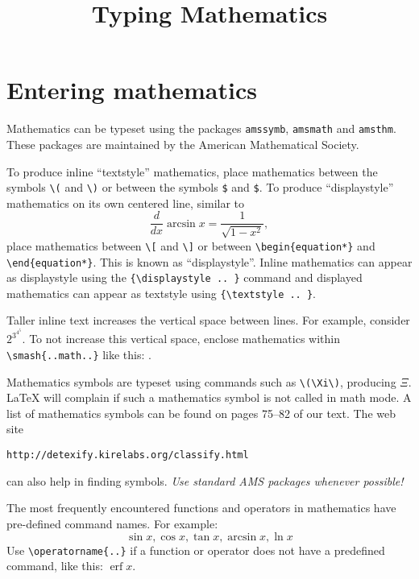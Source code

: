 \documentclass{article}
\title{Typing Mathematics}
\date{}
\begin{document}
\maketitle

\section{Entering mathematics}

Mathematics can be typeset using the packages \texttt{amssymb},
\texttt{amsmath} and \texttt{amsthm}.  These packages are maintained by the
American Mathematical Society.

To produce inline ``textstyle'' mathematics, place mathematics between the
symbols \verb`\(` and \verb`\)` or between the symbols \verb`$` and \verb`$`.
To produce ``displaystyle'' mathematics on its own centered line, similar to
\begin{equation*}
  \frac{d}{dx} \arcsin x = \frac{1}{\sqrt{1 - x^2}},
\end{equation*}
place mathematics between \verb`\[` and \verb`\]` or between
\verb`\begin{equation*}` and \verb`\end{equation*}`.  This is known as
``displaystyle''.  Inline mathematics can appear as displaystyle using the
\verb!{\displaystyle .. }! command and displayed mathematics can appear as
textstyle using \verb`{\textstyle .. }`.

Taller inline text increases the vertical space between lines.  For example,
consider \(2^{3^{4^5}}\).  To not increase this vertical space, enclose
mathematics within \verb~\smash{..math..}~ like this: .

Mathematics symbols are typeset using commands such as \verb~\(\Xi\)~,
producing \(\Xi\).  \LaTeX{} will complain if such a mathematics symbol is not
called in math mode.  A list of mathematics symbols can be found on pages 75--82
of our text.  The web site
\begin{center}
  \texttt{http://detexify.kirelabs.org/classify.html}
\end{center}
can also help in finding symbols.  \emph{Use standard AMS packages whenever
  possible!}

The most frequently encountered functions and operators in mathematics have
pre-defined command names.  For example:
\[
  \sin x, \cos x, \tan x, \arcsin x, \ln x
\]
Use \verb~\operatorname{..}~ if a function or operator does not have a
predefined command, like this: \(\operatorname{erf}x\).
\end{document}
